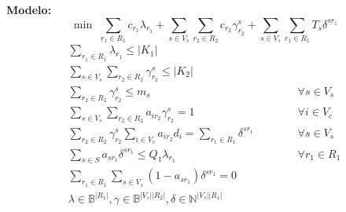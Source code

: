 \documentclass[12pt]{article}
\begin{document}
\noindent\textbf{Modelo:}
\vspace{5mm}
$$\min \,\, \sum\limits_{r_1 \in R_1} {c_{r_1} \lambda_{r_1}} + \sum\limits_{s \in V_s} {\sum\limits_{r_2 \in R_2}{c_{r_2} \gamma^s_{r_2}}} + \sum\limits_{s \in V_s} { \sum\limits_{r_1 \in R_1} T_s \delta^{sr_1} }$$
\begin{eqnarray}
\label{primal01}
  \sum\limits_{ r_1 \in R_1 } { \lambda_{r_1} } \le |K_1| \\
\label{primal02}
  \sum\limits_{ s \in V_s } { \sum\limits_{ r_2 \in R_2 } { \gamma^s_{r_2} } } \le |K_2| \\
\label{primal03}
  \sum\limits_{ r_2 \in R_2 } { \gamma^s_{r_2} } \le m_s & \hspace{1cm} & \forall s \in V_s \\
\label{primal04}
  \sum\limits_{ s \in V_s } { \sum\limits_{ r_2 \in R_2 } { a_{ir_2} \gamma^s_{r_2} } } = 1 & \hspace{1cm} & \forall i \in V_c \\
\label{primal05}
  \sum\limits_{ r_2 \in R_2 } { \gamma^s_{r_2} \sum\limits_{ i \in V_c }{ a_{ir_2} d_i } } = \sum\limits_{ r_1 \in R_1 }{\delta^{sr_1}} & \hspace{1cm} & \forall s \in V_s \\
\label{primal06}
  \sum\limits_{ s \in S } { a_{sr_1} \delta^{sr_1} \leq Q_1 \lambda_{r_1} } & \hspace{1cm} & \forall r_1 \in R_1 \\
\label{primal07}
  \sum\limits_{ r_1 \in R_1 } { \sum\limits_{ s \in V_s } { (1-a_{sr_1})\delta^{sr_1} } } = 0 \\
\label{primal08}
  \lambda \in \mathbb{B}^{|R_1|}, \gamma \in \mathbb{B}^{|V_s||R_2|}, \delta \in \mathbb{N}^{|V_s||R_1|}
\end{eqnarray}
\end{document}
